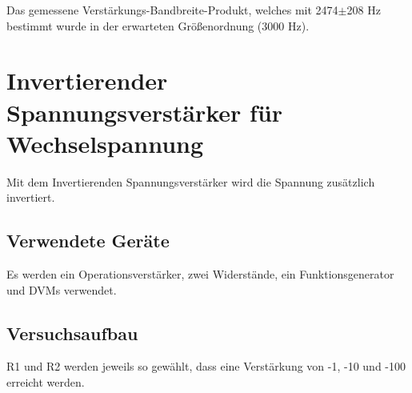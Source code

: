 \documentclass[12pt,a4paper]{article}
\begin{document}
Das gemessene Verstärkungs-Bandbreite-Produkt, welches mit 2474$\pm$208 Hz bestimmt wurde in der erwarteten Größenordnung (3000 Hz).

\section{Invertierender Spannungsverstärker für Wechselspannung}
Mit dem Invertierenden Spannungsverstärker wird die Spannung zusätzlich invertiert.
\subsection{Verwendete Geräte}

Es werden ein Operationsverstärker, zwei Widerstände, ein Funktionsgenerator und DVMs verwendet.


\subsection{Versuchsaufbau}

R1 und R2 werden jeweils so gewählt, dass eine Verstärkung von -1, -10 und -100 erreicht werden.
\end{document}
